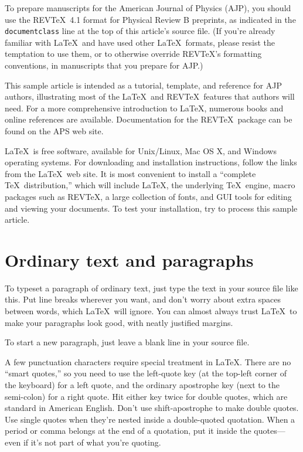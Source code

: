\documentclass[prb,preprint]{revtex4-1}
\begin{document}
To prepare manuscripts for the American Journal of Physics (AJP), 
you should use the REV\TeX\ 4.1 format for Physical Review B
preprints, as indicated in the \texttt{documentclass} line at the top 
of this article's source file.  (If you're already familiar with 
\LaTeX\ and have used other \LaTeX\ formats, please resist the 
temptation to use them, or to otherwise override REV\TeX's formatting 
conventions, in manuscripts that you prepare for AJP.)

This sample article is intended as a tutorial, template, and reference for 
AJP authors, illustrating most of the \LaTeX\ and REV\TeX\ features that 
authors will need.  For a more comprehensive introduction to \LaTeX, 
numerous books and online references are available.\cite{latexsite, 
wikibook, latexbook}  Documentation for the REV\TeX\ package 
can be found on the APS web site.\cite{revtex}

\LaTeX\ is free software, available for Unix/Linux, Mac OS X, and Windows
operating systems. For downloading and installation instructions, follow
the links from the \LaTeX\ web site.\cite{latexsite} It is most
convenient\cite{cloudLaTeX} to install a ``complete \TeX\ distribution,'' 
which will include \LaTeX, the underlying \TeX\ engine, macro packages 
such as REV\TeX, a large collection of fonts, and GUI tools for editing 
and viewing your documents.  To test your installation, try to process
this sample article.


\section{Ordinary text and paragraphs}

To typeset a paragraph of ordinary text, just type the text in your source
file like this. Put line breaks
wherever
you
want, and don't      worry      about      extra      spaces      between      words, which \LaTeX\ will ignore.  You can almost always trust \LaTeX\ to make your paragraphs look good, with neatly justified margins.  %

To start a new paragraph, just leave a blank line in your source file.

A few punctuation characters require special treatment in \LaTeX. There 
are no ``smart quotes,'' so you need to use the left-quote key (at the 
top-left corner of the keyboard) for a left quote, and the ordinary apostrophe
key (next to the semi-colon) for a right quote. Hit either key twice for double
quotes, which are standard in American English.  Don't use shift-apostrophe
to make double quotes.  Use single quotes when they're nested inside a 
double-quoted quotation.  When a period or comma belongs at the end of
a quotation, put it inside the quotes---even if it's not part of what you're
quoting.\cite{nevermindlogic}
\end{document}
